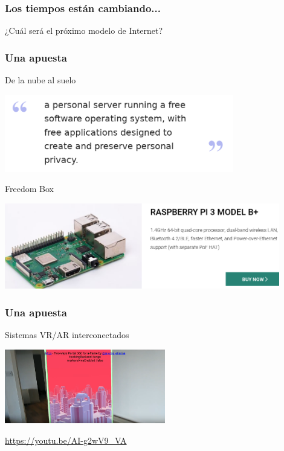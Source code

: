 \begin{frame}[fragile]
  \frametitle{Los tiempos están cambiando...}


  ¿Cuál será el próximo modelo de Internet?
  
\end{frame}

\begin{frame}[fragile]
  \frametitle{Una apuesta}

  De la nube al suelo

  \begin{center}
  \includegraphics[width=10cm]{figs/freedom-box}
  \end{center}

  Freedom Box
  
\end{frame}

\begin{frame}[fragile]

  \begin{center}
  \includegraphics[width=12cm]{figs/raspberry-pi}
  \end{center}

  
\end{frame}


\begin{frame}[fragile]
  \frametitle{Una apuesta}

  Sistemas VR/AR interconectados

  \begin{center}
  \includegraphics[width=7cm]{figs/aframe-portal}
  \end{center}

  {\small
  \url{https://youtu.be/AI-g2wV9_VA}
  }
  
\end{frame}

